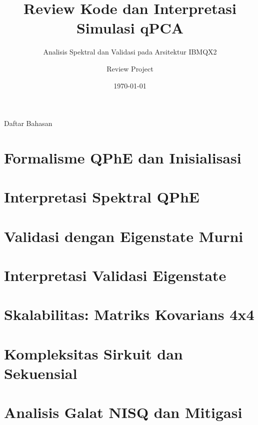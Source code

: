 \documentclass[10pt, aspectratio=169]{beamer}
\title{Review Kode dan Interpretasi Simulasi qPCA}
\subtitle{Analisis Spektral dan Validasi pada Arsitektur IBMQX2}
\author{Review Project}
\date{\today}
\begin{document}
\maketitle

\begin{frame}{Daftar Bahasan}
    \tableofcontents
\end{frame}

\section{Formalisme QPhE dan Inisialisasi}


\section{Interpretasi Spektral QPhE}


\section{Validasi dengan Eigenstate Murni}


\section{Interpretasi Validasi Eigenstate}


\section{Skalabilitas: Matriks Kovarians 4x4}


\section{Kompleksitas Sirkuit dan Sekuensial}


\section{Analisis Galat NISQ dan Mitigasi}

\end{document}
